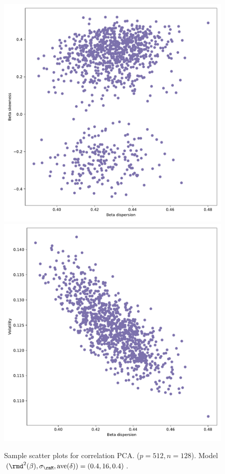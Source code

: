 \documentclass[leqno,12pt]{article}
\begin{document}
{\begin{figure}[htp]
\begin{center}
  \includegraphics[scale=0.33]{img/SampleCorDispersionvsSkew1factorsN128T256disp04fvol16minsvol10maxsvol50}
  \includegraphics[scale=0.33]{img/SampleCorDispersionvsVolatility1factorsN128T256disp04fvol16minsvol10maxsvol50}
\end{center}
\caption{Sample scatter plots for correlation PCA.
($p = 512, n = 128$). Model 
$(\rmd^2(\beta), \sigma_\rmM, \text{ave}(\delta))
= (0.4, 16, 0.4)$.} 
\end{figure}


}
\end{document}
